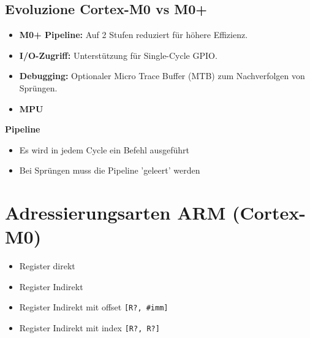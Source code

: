 \subsection{Evoluzione Cortex-M0 vs M0+}
\begin{minipage}[t]{0.49\columnwidth}
    \begin{itemize}
        \item \textbf{M0+ Pipeline:} Auf 2 Stufen reduziert für höhere Effizienz.
        \item \textbf{I/O-Zugriff:} Unterstützung für Single-Cycle GPIO.
        \item \textbf{Debugging:} Optionaler Micro Trace Buffer (MTB) zum Nachverfolgen von Sprüngen.
        \item \textbf{MPU}
    \end{itemize}
\end{minipage}\hfill
\begin{minipage}[t]{0.49\columnwidth}
    \textbf{Pipeline}
    \begin{itemize}
        \item[+] Es wird in jedem Cycle ein Befehl ausgeführt
        \item [-] Bei Sprüngen muss die Pipeline 'geleert' werden
    \end{itemize}
\end{minipage}


\section{Adressierungsarten ARM (Cortex-M0)}
\begin{minipage}{0.5\columnwidth}
    \begin{itemize}
        \item Register direkt
        \item Register Indirekt
    \end{itemize}
\end{minipage}
\begin{minipage}{0.5\columnwidth}
    \begin{itemize}
        \item Register Indirekt mit offset \texttt{[R?, \#imm]}
        \item Register Indirekt mit index \texttt{[R?, R?]}
    \end{itemize}
\end{minipage}

